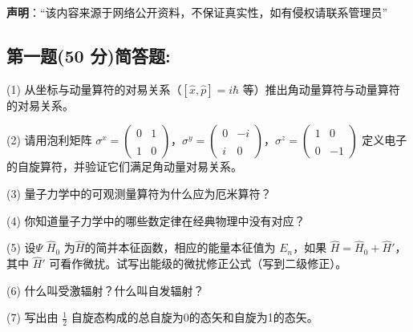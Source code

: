
\textbf{声明}：“该内容来源于网络公开资料，不保证真实性，如有侵权请联系管理员”

\subsection{第一题(50 分)简答题:}
(1) 从坐标与动量算符的对易关系（$[\hat{x}, \hat{p}] = i\hbar$ 等）推出角动量算符与动量算符的对易关系。

(2) 请用泡利矩阵 $\sigma^x = \begin{pmatrix} 0 & 1 \\\\ 1 & 0 \end{pmatrix}$，$\sigma^y = \begin{pmatrix} 0 & -i \\\\ i & 0 \end{pmatrix}$，$\sigma^z = \begin{pmatrix} 1 & 0 \\\\ 0 & -1 \end{pmatrix}$ 定义电子的自旋算符，并验证它们满足角动量对易关系。

(3) 量子力学中的可观测量算符为什么应为厄米算符？

(4) 你知道量子力学中的哪些数定律在经典物理中没有对应？

(5) 设$\Psi$ $\hat{H}_0$ 为$\hat{H}$的简并本征函数，相应的能量本征值为 $E_n$，如果 $\hat{H} = \hat{H}_0 + \hat{H}'$，其中 $\hat{H}'$ 可看作微扰。试写出能级的微扰修正公式（写到二级修正）。

(6) 什么叫受激辐射？什么叫自发辐射？

(7) 写出由 $\frac{1}{2}$ 自旋态构成的总自旋为0的态矢和自旋为1的态矢。